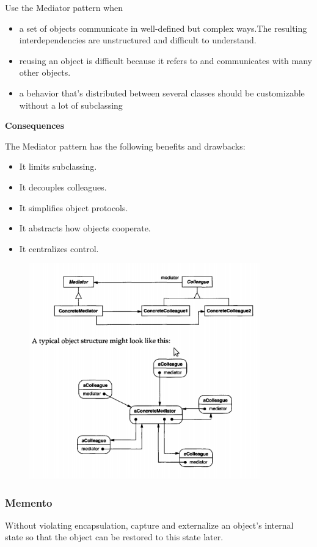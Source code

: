 \documentclass{article}
\begin{document}
Use the Mediator pattern when

\begin{itemize}
    \item a set of objects communicate in well-defined but complex ways.The resulting interdependencies are unstructured and difficult to understand. 
    \item reusing an object is difficult because it refers to and communicates with many other objects.
    \item a behavior that's distributed between several classes should be customizable without a lot of subclassing
\end{itemize}

\textbf{Consequences}

The Mediator pattern has the following benefits and drawbacks:
\begin{itemize}
    \item It limits subclassing.
    \item It decouples colleagues.
    \item It simplifies object protocols.
    \item It abstracts how objects cooperate.
    \item It centralizes control.
\end{itemize}

\begin{figure}[h]
    \centering
    \includegraphics[width=10cm]{diagrams/pattern-17-mediator.png}
\end{figure}

\newpage
\subsubsection{Memento}
Without violating encapsulation, capture and externalize an object's internal state so that the object can be restored to this state later.
\end{document}
